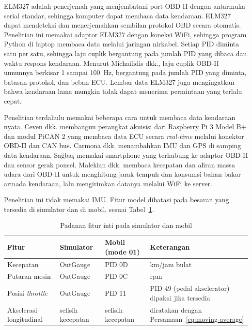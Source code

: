 ELM327 adalah penerjemah yang menjembatani port OBD-II dengan antarmuka serial standar, sehingga komputer dapat membaca data kendaraan. ELM327 dapat mendeteksi dan menerjemahkan sembilan protokol OBD secara otomatis. Penelitian ini memakai adaptor ELM327 dengan koneksi WiFi, sehingga program Python di laptop membaca data melalui jaringan nirkabel. Setiap PID diminta satu per satu, sehingga laju cuplik bergantung pada jumlah PID yang dibaca dan waktu respons kendaraan. Menurut Michailidis dkk., laju cuplik OBD-II umumnya berkisar 1 sampai 100~Hz, bergantung pada jumlah PID yang diminta, batasan protokol, dan beban ECU. Lembar data ELM327 juga mengingatkan bahwa kendaraan lama mungkin tidak dapat menerima permintaan yang terlalu cepat.

Penelitian terdahulu memakai beberapa cara untuk membaca data kendaraan nyata. Ceven dkk. membangun perangkat akuisisi dari Raspberry Pi 3 Model B+ dan modul PiCAN 2 yang membaca data ECU secara \textit{real-time} melalui konektor OBD-II dan CAN bus. Carmona dkk. menambahkan IMU dan GPS di samping data kendaraan. Sa\u{g}ba\c{s} memakai smartphone yang terhubung ke adaptor OBD-II dan sensor gerak ponsel. Malekian dkk. membaca kecepatan dan aliran massa udara dari OBD-II untuk menghitung jarak tempuh dan konsumsi bahan bakar armada kendaraan, lalu mengirimkan datanya melalui WiFi ke server.

Penelitian ini tidak memakai IMU. Fitur model dibatasi pada besaran yang tersedia di simulator dan di mobil, sesuai Tabel~\ref{tab:padanan}.

\begin{table}[H]
  \centering
  \caption{Padanan fitur inti pada simulator dan mobil}
  \label{tab:padanan}
  \small
  \begin{tabular}{|l|l|l|p{4.2cm}|}
    \hline
    \textbf{Fitur} & \textbf{Simulator} & \textbf{Mobil (mode 01)} & \textbf{Keterangan} \\
    \hline
    Kecepatan & OutGauge & PID 0D & km/jam bulat \\
    \hline
    Putaran mesin & OutGauge & PID 0C & rpm \\
    \hline
    Posisi \textit{throttle} & OutGauge & PID 11 & PID 49 (pedal akselerator) dipakai jika tersedia \\
    \hline
    Akselerasi longitudinal & selisih kecepatan & selisih kecepatan & diratakan dengan Persamaan~\ref{eq:moving-average} \\
    \hline
  \end{tabular}
\end{table}

